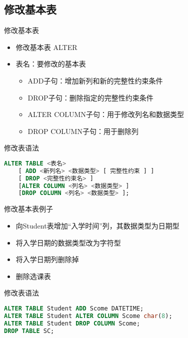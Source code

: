 \subsection{修改基本表}

\begin{frame}[fragile]{修改基本表}
\begin{itemize}
    \item 修改基本表 ALTER
    \item 表名：要修改的基本表
    \begin{itemize}
        \item ADD子句：增加新列和新的完整性约束条件
        \item DROP子句：删除指定的完整性约束条件
        \item ALTER COLUMN子句：用于修改列名和数据类型
        \item DROP COLUMN子句：用于删除列
    \end{itemize}
\end{itemize}
\begin{block}{修改表语法}
\begin{lstlisting}[language=SQL]
ALTER TABLE <表名>
    [ ADD <新列名> <数据类型> [ 完整性约束 ] ]
    [ DROP <完整性约束名> ]
    [ALTER COLUMN <列名> <数据类型> ]
    [DROP COLUMN <列名> <数据类型> ];
\end{lstlisting}
\end{block}
\end{frame}


\begin{frame}[fragile]{修改基本表例子}
\begin{itemize}
    \item 向Student表增加“入学时间”列，其数据类型为日期型
    \item 将入学日期的数据类型改为字符型
    \item 将入学日期列删除掉
    \item 删除选课表
\end{itemize}
\begin{block}{修改表语法}
\begin{lstlisting}[language=SQL]
ALTER TABLE Student ADD Scome DATETIME;
ALTER TABLE Student ALTER COLUMN Scome char(8);
ALTER TABLE Student DROP COLUMN Scome;
DROP TABLE SC;
\end{lstlisting}
\end{block}
\end{frame}

